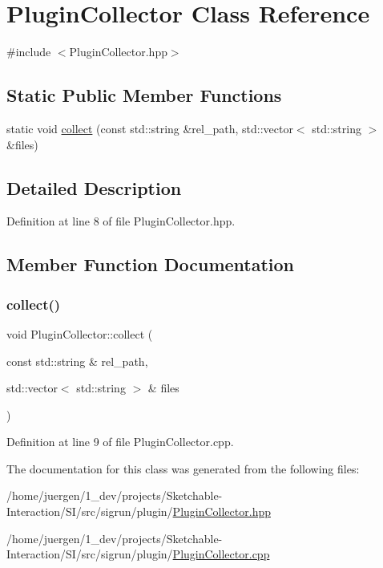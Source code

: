 \hypertarget{class_plugin_collector}{}\section{Plugin\+Collector Class Reference}
\label{class_plugin_collector}


{\ttfamily \#include $<$Plugin\+Collector.\+hpp$>$}

\subsection*{Static Public Member Functions}
\begin{DoxyCompactItemize}
\item 
static void \mbox{\hyperlink{class_plugin_collector_ae96e3b7e48388cf5acddfc8ca750394e}{collect}} (const std\+::string \&rel\+\_\+path, std\+::vector$<$ std\+::string $>$ \&files)
\end{DoxyCompactItemize}


\subsection{Detailed Description}


Definition at line 8 of file Plugin\+Collector.\+hpp.



\subsection{Member Function Documentation}
\mbox{\label{class_plugin_collector_ae96e3b7e48388cf5acddfc8ca750394e}} 
\subsubsection{\texorpdfstring{collect()}{collect()}}
{\footnotesize\ttfamily void Plugin\+Collector\+::collect (\begin{DoxyParamCaption}\item[{const std\+::string \&}]{rel\+\_\+path,  }\item[{std\+::vector$<$ std\+::string $>$ \&}]{files }\end{DoxyParamCaption})\hspace{0.3cm}{\ttfamily [static]}}



Definition at line 9 of file Plugin\+Collector.\+cpp.



The documentation for this class was generated from the following files\+:\begin{DoxyCompactItemize}
\item 
/home/juergen/1\+\_\+dev/projects/\+Sketchable-\/\+Interaction/\+S\+I/src/sigrun/plugin/\mbox{\hyperlink{_plugin_collector_8hpp}{Plugin\+Collector.\+hpp}}\item 
/home/juergen/1\+\_\+dev/projects/\+Sketchable-\/\+Interaction/\+S\+I/src/sigrun/plugin/\mbox{\hyperlink{_plugin_collector_8cpp}{Plugin\+Collector.\+cpp}}\end{DoxyCompactItemize}
